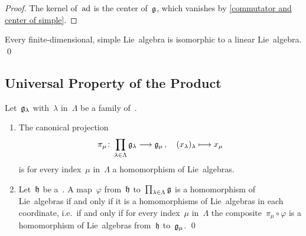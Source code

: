 \begin{proof}
	The kernel of~$\operatorname{ad}$ is the center of~$\mathfrak{g}$, which vanishes by \cref{commutator and center of simple}.
\end{proof}


\begin{corollary}
	Every finite-dimensional, simple Lie~algebra is isomorphic to a linear Lie~algebra.
	\qed
\end{corollary}



\subsection{Universal Property of the Product}


\begin{proposition}
	\label{products of lie algebras}
	Let~$\mathfrak{g}_\lambda$ with~$\lambda$ in~$\Lambda$ be a family of~\liealgebras{$\kf$}.
	\begin{enumerate}
		\item
			The canonical projection
			\[
			 \pi_\mu
			 \colon
			 \prod_{\lambda \in \Lambda} \glie_\lambda
			 \to
			 \glie_\mu \,,
			 \quad
			 ( x_\lambda )_\lambda
			 \mapsto
			 x_\mu
			\]
			is for every index~$\mu$ in~$\Lambda$ a homomorphism of Lie~algebras.
		\item
			Let~$\mathfrak{h}$ be a~\liealgebra{$\kf$}.
			A map~$\varphi$ from~$\mathfrak{h}$ to~$\prod_{\lambda \in \Lambda} \mathfrak{g}$ is a homomorphism of Lie~algebras if and only if it is a homomorphisms of Lie~algebras in each coordinate, i.e.\ if and only if for every index~$\mu$ in~$\Lambda$ the composite~$\pi_\mu \circ \varphi$ is a homomorphism of Lie~algebras from~$\mathfrak{h}$ to~$\mathfrak{g}_\mu$.
		\qed
	\end{enumerate}
\end{proposition}


